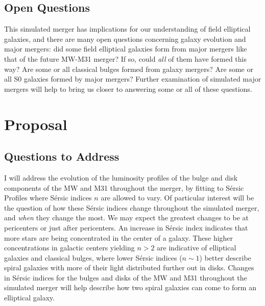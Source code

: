 \documentclass[twocolumn]{aastex631}
\begin{document}
\subsection{Open Questions}
This simulated merger has implications for our understanding of field elliptical galaxies, and there are many open questions concerning galaxy evolution and major mergers: did some field elliptical galaxies form from major mergers like that of the future MW-M31 merger? If so, could \emph{all} of them have formed this way? Are some or all classical bulges formed from galaxy mergers? Are some or all S0 galaxies formed by major mergers? Further examination of simulated major mergers will help to bring us closer to answering some or all of these questions.

\section{Proposal}
\subsection{Questions to Address}
I will address the evolution of the luminosity profiles of the bulge and disk components of the MW and M31 throughout the merger, by fitting to S\'{e}rsic Profiles where S\'ersic indices $n$ are allowed to vary. Of particular interest will be the question of how these S\'{e}rsic indices change throughout the simulated merger, and \emph{when} they change the most. We may expect the greatest changes to be at pericenters or just after pericenters. An increase in S\'{e}rsic index indicates that more stars are being concentrated in the center of a galaxy. These higher concentrations in galactic centers yielding $n > 2$ are indicative of elliptical galaxies and classical bulges, where lower S\'{e}rsic indices ($n \sim 1$) better describe spiral galaxies with more of their light distributed further out in disks. Changes in S\'{e}rsic indices for the bulges and disks of the MW and M31 throughout the simulated merger will help describe how two spiral galaxies can come to form an elliptical galaxy.
\end{document}

